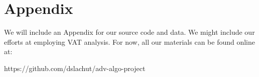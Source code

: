 \section*{Appendix}

  We will include an Appendix for our source code and data. We might include our
  efforts at employing VAT analysis.
  For now, all our materials can be found online at:

  https://github.com/dslachut/adv-algo-project
